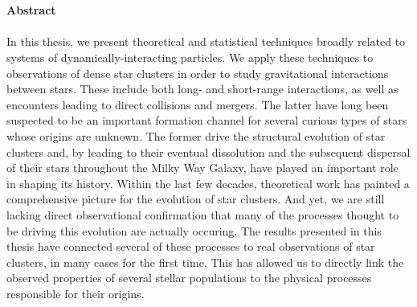 \thispagestyle{fancy}

\textrm{}\\\\
\noindent\textbf{\huge\textsf{Abstract}}\\\\

\noindent In this thesis, we present theoretical and statistical
techniques broadly related to systems of dynamically-interacting
particles.  We apply these techniques to observations of dense 
star clusters in order to study gravitational interactions between
stars.  These include both long- and short-range interactions, as well
as encounters leading to direct collisions and mergers.  The latter
have long been suspected to be an important formation channel for
several curious types of stars whose origins are unknown.  The former
drive the structural evolution of star clusters and, by leading to
their eventual dissolution and the subsequent dispersal of their
stars throughout the Milky Way Galaxy, have played an important role
in shaping its history.  Within the last few decades, theoretical work
has painted a comprehensive picture for the evolution of star
clusters.  And yet, we are still lacking direct observational
confirmation that many of the processes thought to be driving this
evolution are actually occuring.  The results presented in
this thesis have connected several of these processes to real
observations of star clusters, in many cases for the first time.  This
has allowed us to directly link the observed
properties of several stellar populations to the physical
processes responsible for their origins.

